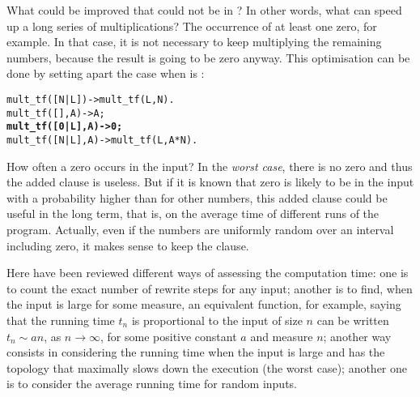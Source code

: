 What could be improved that could not be in ? In
other words, what can speed up a long series of multiplications? The
occurrence of at least one zero, for example. In that case, it is not
necessary to keep multiplying the remaining numbers, because the
result is going to be zero anyway. This optimisation can be done by
setting apart the case when  is :
\begin{alltt}
mult_tf([N|L])   -> mult_tf(L,N).
mult_tf(   [],A) -> A;
\textbf{mult_tf([0|L],A) -> 0;}\hfill% \emph{Improvement.}
mult_tf([N|L],A) -> mult_tf(L,A*N).
\end{alltt}
How often a zero occurs in the input? In the \emph{worst case}, there
is no zero and thus the added clause is useless. But if it is known
that zero is likely to be in the input with a probability higher than
for other numbers, this added clause could be useful in the long term,
that is, on the average time of different runs of the
program. Actually, even if the numbers are uniformly random over an
interval including zero, it makes sense to keep the clause.

Here have been reviewed different ways of assessing the computation
time: one is to count the exact number of rewrite steps for any input;
another is to find, when the input is large for some measure, an
equivalent function, for example, saying that the running time \(t_n\)
is proportional to the input of size \(n\) can be written \(t_n
\mathrel{\sim} an\), as \(n \rightarrow \infty\), for some positive
constant \(a\) and measure \(n\); another way consists in considering
the running time when the input is large and has the topology that
maximally slows down the execution (the worst case); another one is to
consider the average running time for random inputs.
